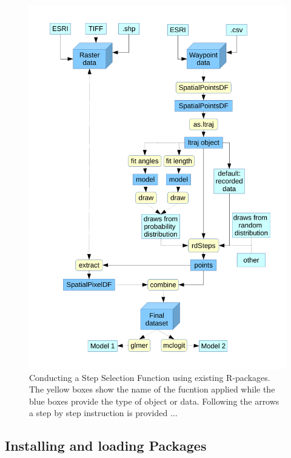 \documentclass[11pt, a4paper]{article}\usepackage[]{graphicx}\usepackage[]{color}
\begin{document}
\begin{figure} %
\captionsetup{width=1\textwidth}
\centering
\includegraphics[width=1\textwidth]{Flowchart.pdf} %
\caption{Conducting a Step Selection Function using existing R-packages. The yellow boxes show the name of the fucntion applied while the blue boxes provide the type of object or data. Following the arrows a step by step instruction is provided ...}
\label{fig:Flowchart}
\end{figure}




\subsection{Installing and loading Packages}
\end{document}
